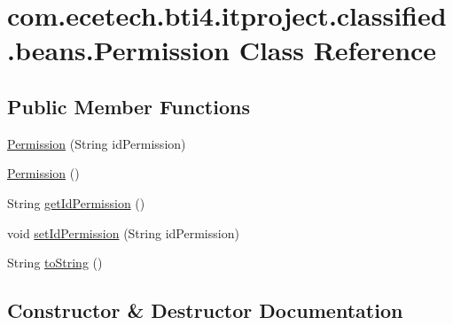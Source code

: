 \hypertarget{classcom_1_1ecetech_1_1bti4_1_1itproject_1_1classified_1_1beans_1_1_permission}{}\section{com.\+ecetech.\+bti4.\+itproject.\+classified.\+beans.\+Permission Class Reference}
\label{classcom_1_1ecetech_1_1bti4_1_1itproject_1_1classified_1_1beans_1_1_permission}
\subsection*{Public Member Functions}
\begin{DoxyCompactItemize}
\item 
\hyperlink{classcom_1_1ecetech_1_1bti4_1_1itproject_1_1classified_1_1beans_1_1_permission_acb409d21056caea5fc1fd771039cce23}{Permission} (String id\+Permission)
\item 
\hyperlink{classcom_1_1ecetech_1_1bti4_1_1itproject_1_1classified_1_1beans_1_1_permission_a00be788fc70f96fb4957fbcc2ddca128}{Permission} ()
\item 
String \hyperlink{classcom_1_1ecetech_1_1bti4_1_1itproject_1_1classified_1_1beans_1_1_permission_ac24aface7ac48c1a5ef3c96b1dbbd408}{get\+Id\+Permission} ()
\item 
void \hyperlink{classcom_1_1ecetech_1_1bti4_1_1itproject_1_1classified_1_1beans_1_1_permission_ae529799454f0cabb0a009797f00d51ea}{set\+Id\+Permission} (String id\+Permission)
\item 
String \hyperlink{classcom_1_1ecetech_1_1bti4_1_1itproject_1_1classified_1_1beans_1_1_permission_aaf7ca3e8fc6870fa55458e6a902b23b0}{to\+String} ()
\end{DoxyCompactItemize}


\subsection{Constructor \& Destructor Documentation}
